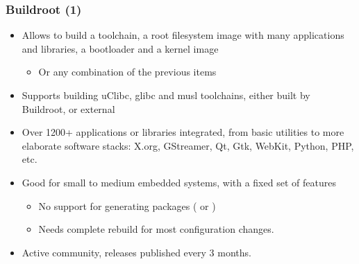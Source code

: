 \begin{frame}
  \frametitle{Buildroot (1)}
  \begin{itemize}
  \item Allows to build a toolchain, a root filesystem image with many
    applications and libraries, a bootloader and a kernel image
    \begin{itemize}
    \item Or any combination of the previous items
    \end{itemize}
  \item Supports building uClibc, glibc and musl toolchains,
    either built by Buildroot, or external
  \item Over 1200+ applications or libraries integrated, from basic
    utilities to more elaborate software stacks: X.org, GStreamer, Qt,
    Gtk, WebKit, Python, PHP, etc.
  \item Good for small to medium embedded systems, with a fixed set of
    features
    \begin{itemize}
    \item No support for generating packages ( or
      )
    \item Needs complete rebuild for most configuration changes.
    \end{itemize}
  \item Active community, releases published every 3 months.
  \end{itemize}
\end{frame}


